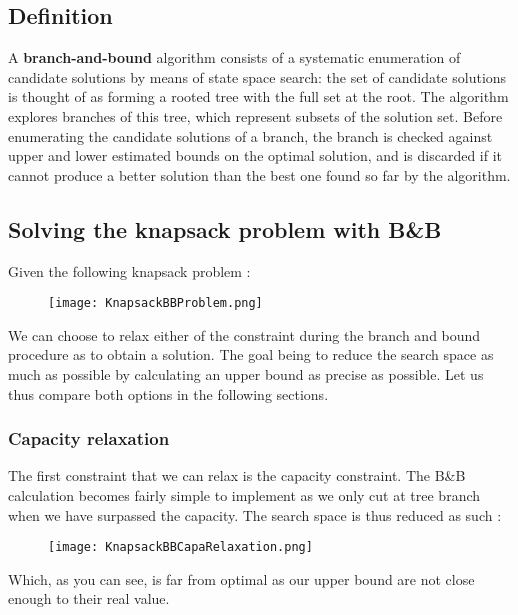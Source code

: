 
\subsection{Definition}

A \textbf{branch-and-bound} algorithm consists of a systematic enumeration of candidate solutions by means of state space search: the set of candidate solutions is thought of as forming a rooted tree with the full set at the root. The algorithm explores branches of this tree, which represent subsets of the solution set. Before enumerating the candidate solutions of a branch, the branch is checked against upper and lower estimated bounds on the optimal solution, and is discarded if it cannot produce a better solution than the best one found so far by the algorithm.

\subsection{Solving the knapsack problem with B\&B}

Given the following knapsack problem :

\begin{figure}[!ht]
    \centering
    \texttt{[image: KnapsackBBProblem.png]}
    \label{fig:Knapsack_example}
\end{figure}
\FloatBarrier

We can choose to relax either of the constraint during the branch and bound procedure 
as to obtain a solution. The goal being to reduce the search space as much as possible
by calculating an upper bound as precise as possible.
Let us thus compare both options in the following sections.

\subsubsection{Capacity relaxation}

The first constraint that we can relax is the capacity constraint. The B\&B
calculation becomes fairly simple to implement as we only cut at tree branch when 
we have surpassed the capacity. The search space is thus reduced as such :

\begin{figure}[!ht]
    \centering
    \texttt{[image: KnapsackBBCapaRelaxation.png]}
    \label{fig:Knapsack_example}
\end{figure}
\FloatBarrier

Which, as you can see, is far from optimal as our upper bound are not close enough to their
real value.

